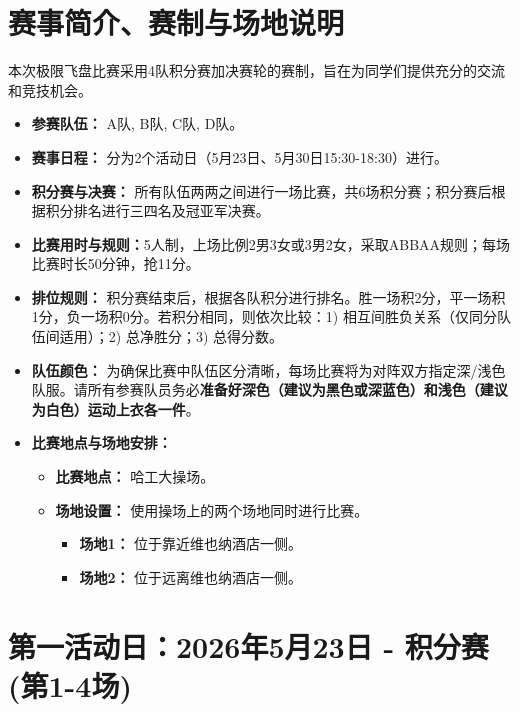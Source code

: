 \documentclass{ctexart}
\begin{document}
\section{赛事简介、赛制与场地说明}
本次极限飞盘比赛采用4队积分赛加决赛轮的赛制，旨在为同学们提供充分的交流和竞技机会。
\begin{itemize}
    \item \textbf{参赛队伍：} A队, B队, C队, D队。
    \item \textbf{赛事日程：} 分为2个活动日（5月23日、5月30日15:30-18:30）进行。
    \item \textbf{积分赛与决赛：} 所有队伍两两之间进行一场比赛，共6场积分赛；积分赛后根据积分排名进行三四名及冠亚军决赛。
    \item \textbf{比赛用时与规则：}5人制，上场比例2男3女或3男2女，采取ABBAA规则；每场比赛时长50分钟，抢11分。
    \item \textbf{排位规则：} 积分赛结束后，根据各队积分进行排名。胜一场积2分，平一场积1分，负一场积0分。若积分相同，则依次比较：1) 相互间胜负关系（仅同分队伍间适用）；2) 总净胜分；3) 总得分数。
    \item \textbf{队伍颜色：} 为确保比赛中队伍区分清晰，每场比赛将为对阵双方指定深/浅色队服。请所有参赛队员务必\textbf{准备好深色（建议为黑色或深蓝色）和浅色（建议为白色）运动上衣各一件}。
    \item \textbf{比赛地点与场地安排：}
    \begin{itemize}
        \item \textbf{比赛地点：} 哈工大操场。
        \item \textbf{场地设置：} 使用操场上的两个场地同时进行比赛。
        \begin{itemize}
            \item \textbf{场地1：} 位于靠近维也纳酒店一侧。
            \item \textbf{场地2：} 位于远离维也纳酒店一侧。
        \end{itemize}
    \end{itemize}
\end{itemize}

\newpage

\section{第一活动日：2026年5月23日 - 积分赛 (第1-4场)}
\end{document}
